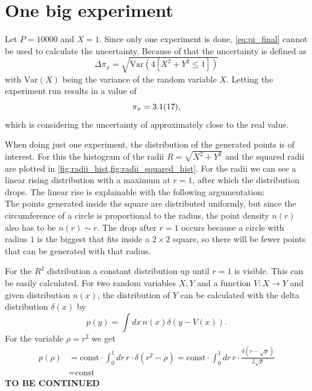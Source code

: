 \section{One big experiment}\label{sec:1}
Let $P = \num{10000}$ and $X = 1$. Since only one experiment is done,
\cref{eq:pi_final} cannot be used to calculate the uncertainty. Because of that
the uncertainty is defined as
\begin{equation}
	\Delta \pi_x = \sqrt{\text{Var}(4[X^2 + Y^2 \leq 1])}
    \label{eq:uncertainty_for_one_x}
\end{equation}
with $\text{Var}(X)$ being the variance of the random variable $X$.
Letting the experiment run results in a value of
\begin{equation}
	\pi_x = \num{3.1 \pm 1.7},
\end{equation}
which is considering the uncertainty of approximately  close to the real value.\par
%
When doing just one experiment, the distribution of the generated points is 
of interest. For this the histogram of the radii $R = \sqrt{X^2 + Y^2}$
and the squared radii are plotted in \cref{fig:radii_hist,fig:radii_squared_hist}.
For the radii we can see a linear rising distribution with a maximum at $r=1$, after which 
the distribution drops. 
The linear rise is explainable with the following argumentation:\\
The points generated inside the square are distributed uniformly, but since 
the circumference of a circle is proportional to the radius, the point density $n(r)$
also has to be $n(r)\sim  r$. The drop after $r = 1$ occurs because 
a circle with radius $1$ is the biggest that fits inside a $2\times 2$ 
square, so there will be fewer points that can be generated with that radius.\par 
For the $R^2$ distribution a constant distribution up until $r=1$ is visible.
This can be easily calculated. For two random variables $X, Y$ and 
a function $V: X \rightarrow Y$ and given distribution $n(x)$, the distribution of 
$Y$ can be calculated with the delta distribution $\delta(x)$ by 
\[
    p(y) = \int dx\, n(x) \delta(y - V(x)).
\] 
For the variable $\rho = r^2$ we get 
\begin{align*}
    p(\rho) &= \text{const}\cdot\int_0^1 dr\, r\cdot\delta(r^2 - \rho)
     = \text{const}\cdot\int_0^1 dr\, r \cdot \frac{\delta(r - \sqrt\rho)}{2\sqrt\rho}\\
     &= \text{const }
\end{align*}
\textbf{TO BE CONTINUED}


